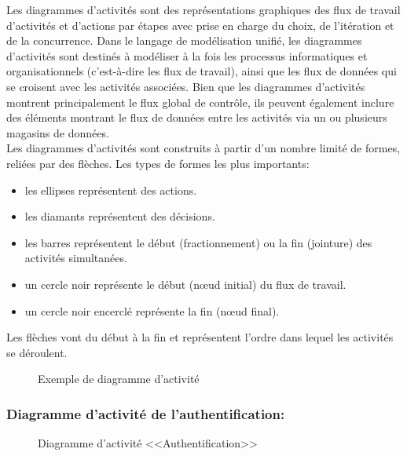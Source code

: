 \documentclass[12pt]{report}
\begin{document}
Les diagrammes d'activités sont des représentations graphiques des flux de travail d'activités et d'actions
par étapes avec prise en charge du choix, de l'itération et de la concurrence.
Dans le langage de modélisation unifié, les diagrammes d'activités sont destinés à modéliser
à la fois les processus informatiques et organisationnels (c'est-à-dire les flux de travail),
ainsi que les flux de données qui se croisent avec les activités associées. Bien que les
diagrammes d'activités montrent principalement le flux global de contrôle, ils peuvent
également inclure des éléments montrant le flux de données entre les activités via un ou
plusieurs magasins de données.
\\
Les diagrammes d'activités sont construits à partir d'un nombre limité de formes, reliées par des flèches. Les types de formes les plus importants:
\begin{itemize}
    \item les ellipses représentent des actions.
    \item les diamants représentent des décisions.
    \item les barres représentent le début (fractionnement) ou la fin (jointure) des activités simultanées.
    \item un cercle noir représente le début (nœud initial) du flux de travail.
    \item un cercle noir encerclé représente la fin (nœud final).
\end{itemize}
Les flèches vont du début à la fin et représentent l'ordre dans lequel les activités se déroulent.

\begin{figure}[h]
\centering
    \caption{Exemple de diagramme d'activité}
\end{figure}

\newpage

\subsubsection{Diagramme d'activité de l'authentification:}

\vspace{0.3in}

\begin{figure}[h]
\centering
    \caption{Diagramme d'activité <<Authentification>>}
\end{figure}
\end{document}
